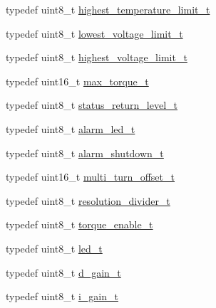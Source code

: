 \begin{DoxyCompactItemize}
\item 
typedef uint8\+\_\+t \hyperlink{structdynamixel_1_1servos_1_1_model_traits_3_01_mx106_01_4_1_1_c_t_a3e9a642f51941c737c1d40e561f8dd3c}{highest\+\_\+temperature\+\_\+limit\+\_\+t}
\item 
typedef uint8\+\_\+t \hyperlink{structdynamixel_1_1servos_1_1_model_traits_3_01_mx106_01_4_1_1_c_t_a9b3a85acec659ee87b8dc1d6174e00e5}{lowest\+\_\+voltage\+\_\+limit\+\_\+t}
\item 
typedef uint8\+\_\+t \hyperlink{structdynamixel_1_1servos_1_1_model_traits_3_01_mx106_01_4_1_1_c_t_a97c1a32d526144abc7e6d93873f2ce84}{highest\+\_\+voltage\+\_\+limit\+\_\+t}
\item 
typedef uint16\+\_\+t \hyperlink{structdynamixel_1_1servos_1_1_model_traits_3_01_mx106_01_4_1_1_c_t_a7337b5f84b413241db18e1f795994242}{max\+\_\+torque\+\_\+t}
\item 
typedef uint8\+\_\+t \hyperlink{structdynamixel_1_1servos_1_1_model_traits_3_01_mx106_01_4_1_1_c_t_a7f4392420340878ca5f723ed47fb7c53}{status\+\_\+return\+\_\+level\+\_\+t}
\item 
typedef uint8\+\_\+t \hyperlink{structdynamixel_1_1servos_1_1_model_traits_3_01_mx106_01_4_1_1_c_t_a798058506f81517dff42eca7d1514529}{alarm\+\_\+led\+\_\+t}
\item 
typedef uint8\+\_\+t \hyperlink{structdynamixel_1_1servos_1_1_model_traits_3_01_mx106_01_4_1_1_c_t_a89d7375c692dec61552d20736f197ef4}{alarm\+\_\+shutdown\+\_\+t}
\item 
typedef uint16\+\_\+t \hyperlink{structdynamixel_1_1servos_1_1_model_traits_3_01_mx106_01_4_1_1_c_t_a94ab13191108b6393e7dda2ebccbafa5}{multi\+\_\+turn\+\_\+offset\+\_\+t}
\item 
typedef uint8\+\_\+t \hyperlink{structdynamixel_1_1servos_1_1_model_traits_3_01_mx106_01_4_1_1_c_t_aa4aa477c0e1427ac07bde5c014b1fecb}{resolution\+\_\+divider\+\_\+t}
\item 
typedef uint8\+\_\+t \hyperlink{structdynamixel_1_1servos_1_1_model_traits_3_01_mx106_01_4_1_1_c_t_a0de072ec1d5f66921ead1a05a67154f5}{torque\+\_\+enable\+\_\+t}
\item 
typedef uint8\+\_\+t \hyperlink{structdynamixel_1_1servos_1_1_model_traits_3_01_mx106_01_4_1_1_c_t_a5be3f69c35fc7d42a111ef0527e9921d}{led\+\_\+t}
\item 
typedef uint8\+\_\+t \hyperlink{structdynamixel_1_1servos_1_1_model_traits_3_01_mx106_01_4_1_1_c_t_afd54421b109461923be30d5d320e5e35}{d\+\_\+gain\+\_\+t}
\item 
typedef uint8\+\_\+t \hyperlink{structdynamixel_1_1servos_1_1_model_traits_3_01_mx106_01_4_1_1_c_t_a506b9446bec1bd217baae086909f12ca}{i\+\_\+gain\+\_\+t}

\end{DoxyCompactItemize}
